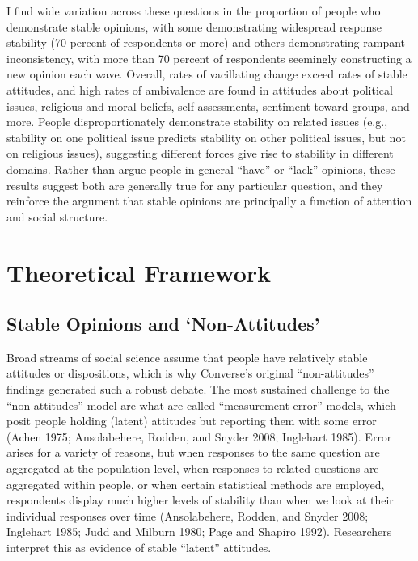 \documentclass[12pt,]{article}
\begin{document}
I find wide variation across these questions in the proportion of people who demonstrate stable opinions, with some demonstrating widespread response stability (70 percent of respondents or more) and others demonstrating rampant inconsistency, with more than 70 percent of respondents seemingly constructing a new opinion each wave. Overall, rates of vacillating change exceed rates of stable attitudes, and high rates of ambivalence are found in attitudes about political issues, religious and moral beliefs, self-assessments, sentiment toward groups, and more. People disproportionately demonstrate stability on related issues (e.g., stability on one political issue predicts stability on other political issues, but not on religious issues), suggesting different forces give rise to stability in different domains. Rather than argue people in general ``have'' or ``lack'' opinions, these results suggest both are generally true for any particular question, and they reinforce the argument that stable opinions are principally a function of attention and social structure.

\hypertarget{theoretical-framework}{%
\section{Theoretical Framework}\label{theoretical-framework}}

\hypertarget{stable-opinions-and-non-attitudes}{%
\subsection{Stable Opinions and `Non-Attitudes'}\label{stable-opinions-and-non-attitudes}}

Broad streams of social science assume that people have relatively stable attitudes or dispositions, which is why Converse's original ``non-attitudes'' findings generated such a robust debate. The most sustained challenge to the ``non-attitudes'' model are what are called ``measurement-error'' models, which posit people holding (latent) attitudes but reporting them with some error (Achen 1975; Ansolabehere, Rodden, and Snyder 2008; Inglehart 1985). Error arises for a variety of reasons, but when responses to the same question are aggregated at the population level, when responses to related questions are aggregated within people, or when certain statistical methods are employed, respondents display much higher levels of stability than when we look at their individual responses over time (Ansolabehere, Rodden, and Snyder 2008; Inglehart 1985; Judd and Milburn 1980; Page and Shapiro 1992). Researchers interpret this as evidence of stable ``latent'' attitudes.
\end{document}
